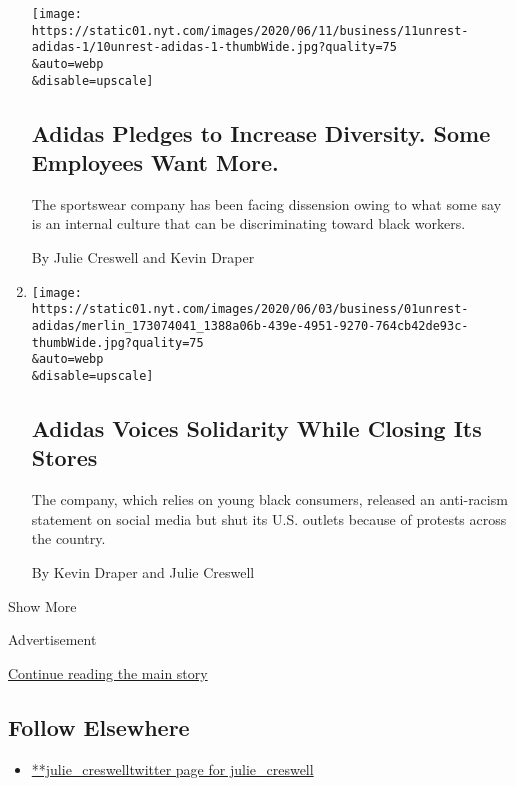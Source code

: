 \begin{enumerate}
  \texttt{[image: https://static01.nyt.com/images/2020/06/11/business/11unrest-adidas-1/10unrest-adidas-1-thumbWide.jpg?quality=75\\\&auto=webp\\\&disable=upscale]}

  \hypertarget{adidas-pledges-to-increase-diversity-some-employees-want-more}{%
  \subsection{Adidas Pledges to Increase Diversity. Some Employees Want
  More.}\label{adidas-pledges-to-increase-diversity-some-employees-want-more}}

  The sportswear company has been facing dissension owing to what some
  say is an internal culture that can be discriminating toward black
  workers.

  By Julie Creswell and Kevin Draper
\item
  \href{/2020/06/02/business/adidas-george-floyd-protests.html}{}

  \texttt{[image: https://static01.nyt.com/images/2020/06/03/business/01unrest-adidas/merlin\_173074041\_1388a06b-439e-4951-9270-764cb42de93c-thumbWide.jpg?quality=75\\\&auto=webp\\\&disable=upscale]}

  \hypertarget{adidas-voices-solidarity-while-closing-its-stores}{%
  \subsection{Adidas Voices Solidarity While Closing Its
  Stores}\label{adidas-voices-solidarity-while-closing-its-stores}}

  The company, which relies on young black consumers, released an
  anti-racism statement on social media but shut its U.S. outlets
  because of protests across the country.

  By Kevin Draper and Julie Creswell
\end{enumerate}

Show More

Advertisement

\protect\hyperlink{after-mid2}{Continue reading the main story}

\hypertarget{follow-elsewhere}{%
\subsection{Follow Elsewhere}\label{follow-elsewhere}}

\begin{itemize}
\tightlist
\item
  \href{https://twitter.com/julie_creswell}{**julie\_creswelltwitter
  page for julie\_creswell}
\end{itemize}

